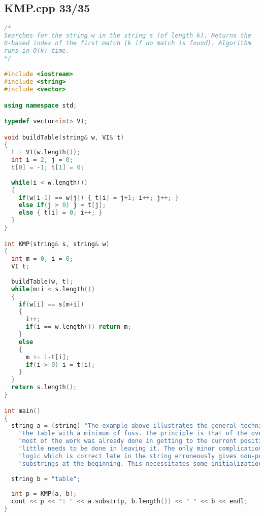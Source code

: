 \subsection{KMP.cpp 33/35}
\begin{lstlisting}[language=C++]
/*
Searches for the string w in the string s (of length k). Returns the
0-based index of the first match (k if no match is found). Algorithm
runs in O(k) time.
*/

#include <iostream>
#include <string>
#include <vector>

using namespace std;

typedef vector<int> VI;

void buildTable(string& w, VI& t)
{
  t = VI(w.length());  
  int i = 2, j = 0;
  t[0] = -1; t[1] = 0;
  
  while(i < w.length())
  {
    if(w[i-1] == w[j]) { t[i] = j+1; i++; j++; }
    else if(j > 0) j = t[j];
    else { t[i] = 0; i++; }
  }
}

int KMP(string& s, string& w)
{
  int m = 0, i = 0;
  VI t;
  
  buildTable(w, t);  
  while(m+i < s.length())
  {
    if(w[i] == s[m+i])
    {
      i++;
      if(i == w.length()) return m;
    }
    else
    {
      m += i-t[i];
      if(i > 0) i = t[i];
    }
  }  
  return s.length();
}

int main()
{
  string a = (string) "The example above illustrates the general technique for assembling "+
    "the table with a minimum of fuss. The principle is that of the overall search: "+
    "most of the work was already done in getting to the current position, so very "+
    "little needs to be done in leaving it. The only minor complication is that the "+
    "logic which is correct late in the string erroneously gives non-proper "+
    "substrings at the beginning. This necessitates some initialization code.";
  
  string b = "table";
  
  int p = KMP(a, b);
  cout << p << ": " << a.substr(p, b.length()) << " " << b << endl;
}

\end{lstlisting}
